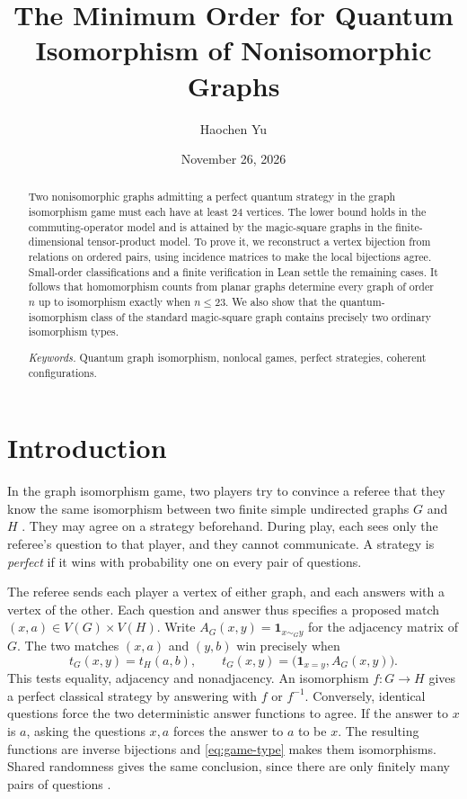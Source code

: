 \documentclass[11pt,reqno]{amsart}
\title[Minimum order for quantum graph isomorphism]{The Minimum Order for Quantum Isomorphism of Nonisomorphic Graphs}
\author{Haochen Yu}
\date{November 26, 2026}
\numberwithin{equation}{section}
\theoremstyle{definition}
\newcommand{\paperkeywords}{Quantum graph isomorphism, nonlocal games, perfect strategies, coherent configurations}
\begin{document}
\begin{abstract}
Two nonisomorphic graphs admitting a perfect quantum strategy in the graph isomorphism game must each have at least $24$ vertices. The lower bound holds in the commuting-operator model and is attained by the magic-square graphs in the finite-dimensional tensor-product model. To prove it, we reconstruct a vertex bijection from relations on ordered pairs, using incidence matrices to make the local bijections agree. Small-order classifications and a finite verification in Lean settle the remaining cases. It follows that homomorphism counts from planar graphs determine every graph of order $n$ up to isomorphism exactly when $n\le23$. We also show that the quantum-isomorphism class of the standard magic-square graph contains precisely two ordinary isomorphism types.

\smallskip\noindent\textit{Keywords.} \paperkeywords.
\end{abstract}
\maketitle
\section{Introduction}\label{sec:intro}
In the graph isomorphism game, two players try to convince a referee that they know the same isomorphism between two finite simple undirected graphs $G$ and $H$ \cite[\S3]{AMRSSV}. They may agree on a strategy beforehand. During play, each sees only the referee's question to that player, and they cannot communicate. A strategy is \emph{perfect} if it wins with probability one on every pair of questions.

The referee sends each player a vertex of either graph, and each answers with a vertex of the other. Each question and answer thus specifies a proposed match $(x,a)\in V(G)\times V(H)$. Write $A_G(x,y)=\mathbf 1_{x\sim_G y}$ for the adjacency matrix of $G$. The two matches $(x,a)$ and $(y,b)$ win precisely when
\begin{equation}\label{eq:game-type}
 t_G(x,y)=t_H(a,b),\qquad t_G(x,y)=\bigl(\mathbf 1_{x=y},A_G(x,y)\bigr).
\end{equation}
This tests equality, adjacency and nonadjacency. An isomorphism $f:G\to H$ gives a perfect classical strategy by answering with $f$ or $f^{-1}$. Conversely, identical questions force the two deterministic answer functions to agree. If the answer to $x$ is $a$, asking the questions $x,a$ forces the answer to $a$ to be $x$. The resulting functions are inverse bijections and \eqref{eq:game-type} makes them isomorphisms. Shared randomness gives the same conclusion, since there are only finitely many pairs of questions \cite[\S3.1]{AMRSSV}.
\end{document}
